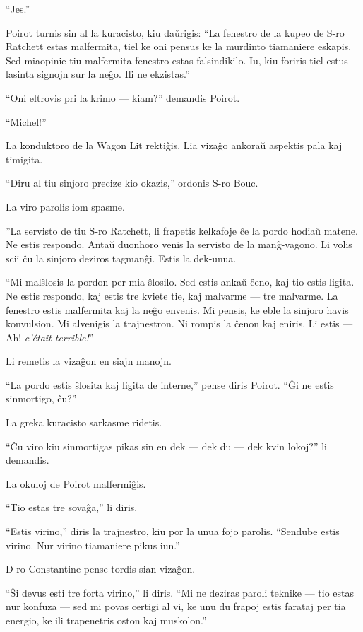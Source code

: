``Jes.''

Poirot turnis sin al la kuracisto, kiu daŭrigis: ``La fenestro de la kupeo de S-ro Ratchett estas malfermita, tiel ke oni pensus ke la murdinto tiamaniere eskapis. Sed miaopinie tiu malfermita fenestro estas falsindikilo. Iu, kiu foriris tiel estus lasinta signojn sur la neĝo. Ili ne ekzistas.''

``Oni eltrovis pri la krimo --- kiam?'' demandis Poirot.

``Michel!''

La konduktoro de la Wagon Lit rektiĝis. Lia vizaĝo ankoraŭ aspektis pala kaj timigita.

``Diru al tiu sinjoro precize kio okazis,'' ordonis S-ro Bouc.

La viro parolis iom spasme.

''La servisto de tiu S-ro Ratchett, li frapetis kelkafoje ĉe la pordo hodiaŭ matene. Ne estis respondo. Antaŭ duonhoro venis la servisto de la manĝ-vagono. Li volis scii ĉu la sinjoro deziros tagmanĝi. Estis la dek-unua.

``Mi malŝlosis la pordon per mia ŝlosilo. Sed estis ankaŭ ĉeno, kaj tio estis ligita. Ne estis respondo, kaj estis tre kviete tie, kaj malvarme --- tre malvarme. La fenestro estis malfermita kaj la neĝo envenis. Mi pensis, ke eble la sinjoro havis konvulsion. Mi alvenigis la trajnestron. Ni rompis la ĉenon kaj eniris. Li estis --- Ah! \emph{c'était terrible!}''

Li remetis la vizaĝon en siajn manojn.

``La pordo estis ŝlosita kaj ligita de interne,'' pense diris Poirot. ``Ĝi ne estis sinmortigo, ĉu?''

La greka kuracisto sarkasme ridetis.

``Ĉu viro kiu sinmortigas pikas sin en dek --- dek du --- dek kvin lokoj?'' li demandis.

La okuloj de Poirot malfermiĝis.

``Tio estas tre sovaĝa,'' li diris.

``Estis virino,'' diris la trajnestro, kiu por la unua fojo parolis. ``Sendube estis virino. Nur virino tiamaniere pikus iun.''

D-ro Constantine pense tordis sian vizaĝon.

``Ŝi devus esti tre forta virino,'' li diris. ``Mi ne deziras paroli teknike --- tio estas nur konfuza --- sed mi povas certigi al vi, ke unu du frapoj estis farataj per tia energio, ke ili trapenetris oston kaj muskolon.''

